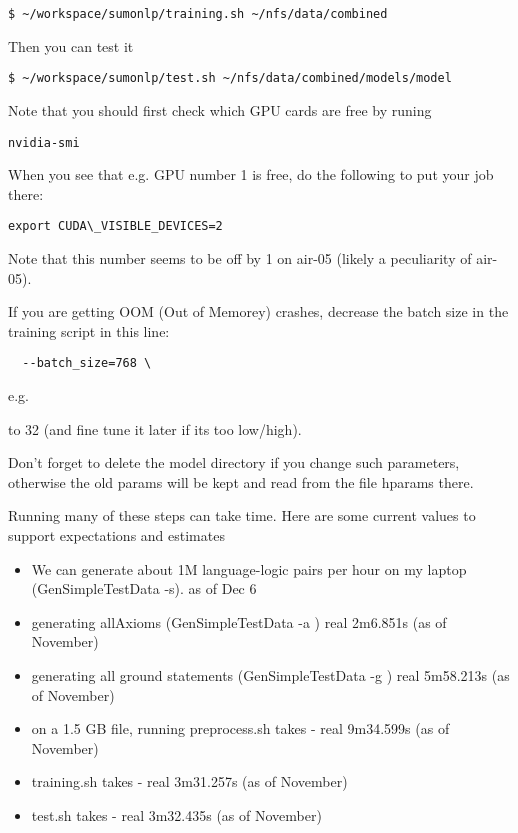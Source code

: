 \documentclass[letterpaper]{article}
\begin{document}
\begin{verbatim}
$ ~/workspace/sumonlp/training.sh ~/nfs/data/combined
\end{verbatim}

Then you can test it

\begin{verbatim}
$ ~/workspace/sumonlp/test.sh ~/nfs/data/combined/models/model
\end{verbatim}

Note that you should first check which GPU cards are free by runing

\begin{verbatim}
nvidia-smi
\end{verbatim}

When you see that e.g. GPU number 1 is free, do the following to put your job there:

\begin{verbatim}
export CUDA\_VISIBLE_DEVICES=2
\end{verbatim}

Note that this number seems to be off by 1 on air-05 (likely a peculiarity of air-05).

If you are getting OOM (Out of Memorey) crashes, decrease the batch size in the training script in this line:

\begin{verbatim}
  --batch_size=768 \
\end{verbatim}

e.g.

to 32 (and fine tune it later if its too low/high).

Don't forget to delete the model directory if you change such parameters, otherwise the old params will be kept and read from the file hparams there.

Running many of these steps can take time. Here are some current values to support expectations and estimates

\begin{itemize}
\item We can generate about 1M language-logic pairs per hour on my laptop (GenSimpleTestData -s). as of Dec 6
\item generating allAxioms (GenSimpleTestData -a ) real 2m6.851s (as of November)
\item generating all ground statements (GenSimpleTestData -g ) real 5m58.213s (as of November)
\item on a 1.5 GB file, running preprocess.sh takes - real 9m34.599s (as of November)
\item training.sh takes - real 3m31.257s (as of November)
\item test.sh takes - real 3m32.435s (as of November)
\end{itemize}
\end{document}
